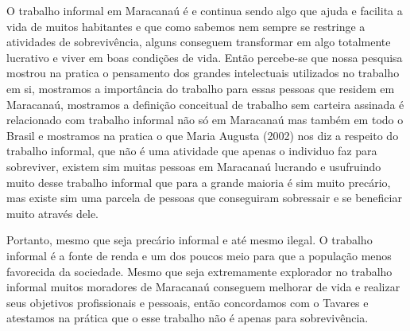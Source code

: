 O trabalho informal em Maracanaú é e continua sendo algo que ajuda e facilita a 
vida de muitos habitantes e que como sabemos nem sempre se restringe a 
atividades de sobrevivência, alguns conseguem transformar em algo totalmente 
lucrativo e viver em boas condições de vida. Então percebe-se que nossa pesquisa 
mostrou na pratica o pensamento dos grandes intelectuais utilizados no trabalho 
em si, mostramos a importância do trabalho para essas pessoas que residem em 
Maracanaú, mostramos a definição conceitual de trabalho sem carteira assinada é 
relacionado com trabalho informal não só em Maracanaú mas também em todo o 
Brasil e mostramos na pratica o que Maria Augusta (2002)  nos diz a respeito do 
trabalho informal, que não é uma atividade que apenas o individuo faz para 
sobreviver, existem sim muitas pessoas em Maracanaú lucrando e usufruindo muito 
desse trabalho informal que para a grande maioria é sim muito precário, mas 
existe sim uma parcela de pessoas que conseguiram sobressair e se beneficiar 
muito através dele. 

Portanto, mesmo que seja precário informal e até mesmo ilegal. O trabalho 
informal é a fonte de renda e um dos poucos meio para que a população menos 
favorecida da sociedade. Mesmo que seja extremamente explorador no trabalho 
informal muitos moradores de Maracanaú conseguem melhorar de vida e realizar 
seus objetivos profissionais e pessoais, então concordamos com o Tavares e 
atestamos na prática que o esse trabalho não é apenas para sobrevivência. 
